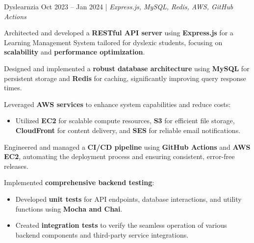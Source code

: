 \resumeSubheadings
    {Dyslearnzia }{Oct 2023 -- Jan 2024}
    {}{}{| \textit{Express.js, MySQL, Redis, AWS, GitHub Actions}}
    \resumeItemListStart
    \item Architected and developed a \textbf{RESTful API server} using \textbf{Express.js} for a Learning Management System tailored for dyslexic students, focusing on \textbf{scalability} and \textbf{performance optimization}.
    \item Designed and implemented a \textbf{robust database architecture} using \textbf{MySQL} for persistent storage and \textbf{Redis} for caching, significantly improving query response times.
    \item Leveraged \textbf{AWS services} to enhance system capabilities and reduce costs:
      \begin{itemize}
        \item Utilized \textbf{EC2} for scalable compute resources, \textbf{S3} for efficient file storage, \textbf{CloudFront} for content delivery, and \textbf{SES} for reliable email notifications.
      \end{itemize}
    \item Engineered and managed a \textbf{CI/CD pipeline} using \textbf{GitHub Actions} and \textbf{AWS EC2}, automating the deployment process and ensuring consistent, error-free releases.
    \item Implemented \textbf{comprehensive backend testing}:
      \begin{itemize}
        \item Developed \textbf{unit tests} for API endpoints, database interactions, and utility functions using \textbf{Mocha and Chai}.
        \item Created \textbf{integration tests} to verify the seamless operation of various backend components and third-party service integrations.
      \end{itemize}
    \resumeItemListEnd